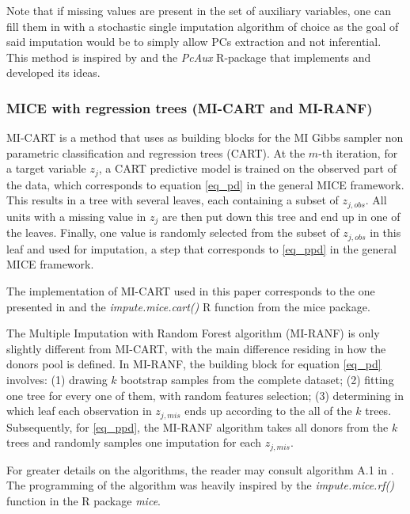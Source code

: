 	Note that if missing values are present in the set of auxiliary variables, one can fill them in with a 
	stochastic single imputation algorithm of choice as the goal of said imputation would be to simply
	allow PCs extraction and not inferential. 
	This method is inspired by \cite{howardEtAl:2015} and the \emph{PcAux} R-package \citep{PcAux} that 
	implements and developed its ideas.
	
\subsubsection{MICE with regression trees (MI-CART and MI-RANF)}
	MI-CART is a method that uses as building blocks for the MI Gibbs sampler non parametric classification
	and regression trees (CART).
	At the $m$-th iteration, for a target variable $z_j$, a CART predictive model is trained on the observed 
	part of the data, which corresponds to equation \ref{eq_pd} in the general MICE framework.
	This results in a tree with several leaves, each containing a subset of $z_{j, obs}$. 
	All units with a missing value in $z_{j}$ are then put down this tree and end up in one of the leaves.
	Finally, one value is randomly selected from the subset of $z_{j, obs}$ in this leaf and used for imputation,
	a step that corresponds to \ref{eq_ppd} in the general MICE framework.

	The implementation of MI-CART used in this paper corresponds to the one presented in 
	\cite[p. 95, algorithm 1]{dooveEtAl:2014}
	and the \emph{impute.mice.cart()} R function from the mice package.

	The Multiple Imputation with Random Forest algorithm (MI-RANF) is only slightly different from MI-CART, 
	with the main difference residing in how the donors pool is defined.
	In MI-RANF, the building block for equation \ref{eq_pd} involves: (1) drawing $k$ bootstrap samples from 
	the complete dataset; 
	(2) fitting one tree for every one of them, with random features selection; 
	(3) determining in which leaf each observation in $z_{j, mis}$ ends up according to the all of the $k$ trees.
	Subsequently, for \ref{eq_ppd}, the MI-RANF algorithm takes all donors from the $k$ trees and randomly 
	samples one imputation for each $z_{j, mis}$.

	For greater details on the algorithms, the reader may consult algorithm A.1 in 
	\cite[p. 103, appendix B]{dooveEtAl:2014}.
	The programming of the algorithm was heavily inspired by the \emph{impute.mice.rf()} function in the 
	R package \emph{mice}.

